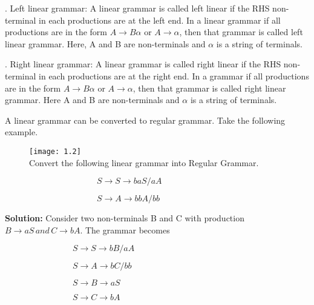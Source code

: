 \documentclass[10pt,a4paper]{book}
\begin{document}
\qquad 

\!\!\!\!\!\!\!\!\!. Left linear grammar: A linear grammar is called left linear if the RHS non-terminal in each
productions are at the left end. In a linear grammar if all productions are in the form $A \rightarrow B\alpha$ or $A \rightarrow \alpha$, then that grammar is called left linear grammar. Here, A and B are non-terminals and $\alpha$
is a string of terminals.

\!\!\!\!\!\!\!\!\!. Right linear grammar: A linear grammar is called right linear if the RHS non-terminal in each
productions are at the right end. In a grammar if all productions are in the form $A \rightarrow B\alpha$ or $A \rightarrow \alpha$, then that grammar is called right linear grammar. Here A and B are non-terminals and $\alpha$ is a string
of terminals.

\;

\!\!\!\!\!\!\!\!\!\!A linear grammar can be converted to regular grammar. Take the following example.

\begin{flushleft}
\begin{figure}[h]
  \texttt{[image: 1.2]}\\Convert the following linear grammar into Regular Grammar.
  
    $\qquad\qquad\qquad\qquad S \rightarrow S \rightarrow baS/aA$

  $\qquad\qquad\qquad\qquad S \rightarrow A \rightarrow bbA/bb$

\end{figure}
\end{flushleft}

  \textsf{\textbf{\!\!\!\!\!\!\!\!\!\!\!Solution:}} Consider two non-terminals B and C with production $B \rightarrow aS \,and\, C \rightarrow bA$. The grammar becomes

  $\qquad\qquad\qquad\qquad S \rightarrow S \rightarrow bB/aA$

  $\qquad\qquad\qquad\qquad S \rightarrow A \rightarrow bC/bb$

  $\qquad\qquad\qquad\qquad S \rightarrow B \rightarrow aS$

  $\qquad\qquad\qquad\qquad S \rightarrow C \rightarrow bA$
\end{document}
